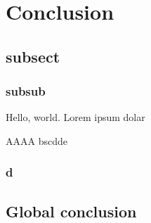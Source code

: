 \chapter{Conclusion}
\section{subsect}
\subsection{subsub}
Hello, world.
Lorem ipsum dolar

AAAA bscdde

\subsection{d}

\section{Global conclusion}
